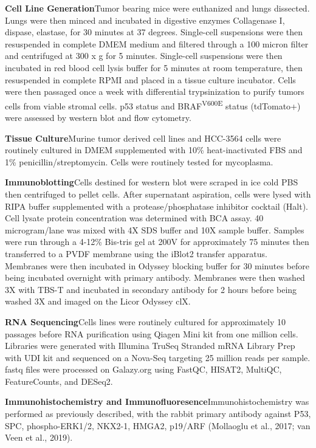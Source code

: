 \textbf{Cell Line Generation}Tumor bearing mice were euthanized and lungs dissected. Lungs were then minced and incubated in digestive enzymes Collagenase I, dispase, elastase, for 30 minutes at 37 degrees. Single-cell suspensions were then resuspended in complete DMEM medium and filtered through a 100 micron filter and centrifuged at 300 x g for 5 minutes. Single-cell suspensions were then incubated in red blood cell lysis buffer for 5 minutes at room temperature, then resuspended in complete RPMI and placed in a tissue culture incubator. Cells were then passaged once a week with differential trypsinization to purify tumors cells from viable stromal cells. p53 status and BRAF\textsuperscript{V600E} status (tdTomato+) were assessed by western blot and flow cytometry.

\textbf{Tissue Culture}Murine tumor derived cell lines and HCC-3564 cells were routinely cultured in DMEM supplemented with 10\% heat-inactivated FBS and 1\% penicillin/streptomycin. Cells were routinely tested for mycoplasma.

\textbf{Immunoblotting}Cells destined for western blot were scraped in ice cold PBS then centrifuged to pellet cells. After supernatant aspiration, cells were lysed with RIPA buffer supplemented with a protease/phosphatase inhibitor cocktail (Halt). Cell lysate protein concentration was determined with BCA assay. 40 microgram/lane was mixed with 4X SDS buffer and 10X sample buffer. Samples were run through a 4-12\% Bis-tris gel at 200V for approximately 75 minutes then transferred to a PVDF membrane using the iBlot2 transfer apparatus. Membranes were then incubated in Odyssey blocking buffer for 30 minutes before being incubated overnight with primary antibody. Membranes were then washed 3X with TBS-T and incubated in secondary antibody for 2 hours before being washed 3X and imaged on the Licor Odyssey clX.

\textbf{RNA Sequencing}Cells lines were routinely cultured for approximately 10 passages before RNA purification using Qiagen Mini kit from one million cells. Libraries were generated with Illumina TruSeq Stranded mRNA Library Prep with UDI kit and sequenced on a Nova-Seq targeting 25 million reads per sample. fastq files were processed on Galazy.org using FastQC, HISAT2, MultiQC, FeatureCounts, and DESeq2.

\textbf{Immunohistochemistry and Immunofluoresence}Immunohistochemistry was performed as previously described, with the rabbit primary antibody against P53, SPC, phospho-ERK1/2, NKX2-1, HMGA2, p19/ARF (Mollaoglu et al., 2017; van Veen et al., 2019).

